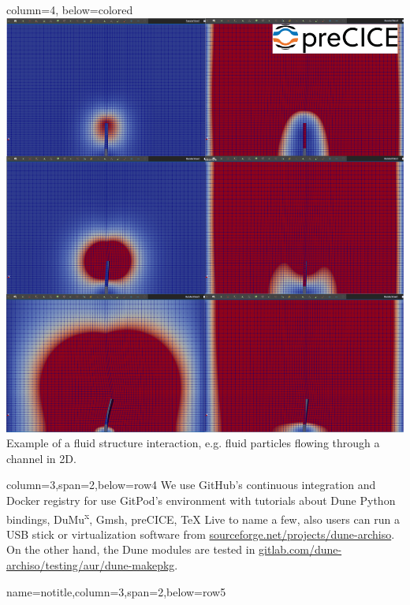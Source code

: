 \documentclass[
	paper=a0,
	style=ruled, %
	]{bfhsciposter}
\begin{document}
\begin{tcbposter}[
		poster={
				columns=4,
				rows=7,
				spacing=1cm,
			},]
	\begin{posterboxenv}{column=4, below=colored}
		\includegraphics[width=\linewidth]{sequence}
		Example of a fluid structure interaction, e.g. fluid particles
		flowing through a channel in 2D.
	\end{posterboxenv}

	\begin{posterboxenv}[BFH-framed,title=GitHub's Docker registry
			\\
			\url{https://github.com/orgs/cpp-review-dune/packages}]{column=3,span=2,below=row4}
		We use GitHub's continuous integration and Docker registry for
		use GitPod's environment with tutorials about Dune Python
		bindings, DuMu\textsuperscript{x}, Gmsh, preCICE, TeX Live to
		name a few, also users can run a USB stick or virtualization
		software from \url{sourceforge.net/projects/dune-archiso}.
		On the other hand, the Dune modules are tested in
		\url{gitlab.com/dune-archiso/testing/aur/dune-makepkg}.
	\end{posterboxenv}

	\begin{posterboxenv}{name=notitle,column=3,span=2,below=row5}
		\nocite{*}
		
	\end{posterboxenv}

\end{tcbposter}
\end{document}
